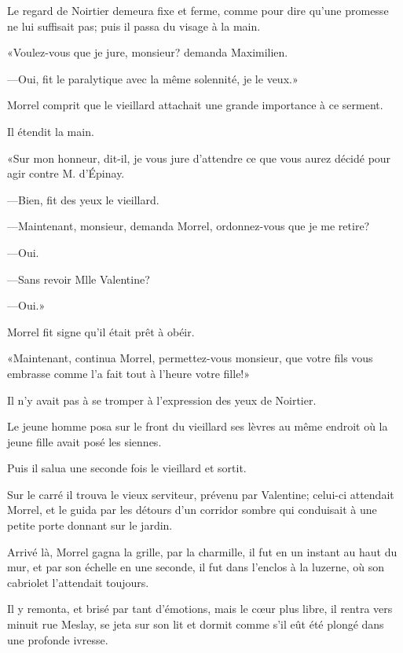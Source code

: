 Le regard de Noirtier demeura fixe et ferme, comme pour dire qu'une promesse ne lui suffisait pas; puis il passa du visage à la main. 

«Voulez-vous que je jure, monsieur? demanda Maximilien. 

—Oui, fit le paralytique avec la même solennité, je le veux.» 

Morrel comprit que le vieillard attachait une grande importance à ce serment. 

Il étendit la main. 

«Sur mon honneur, dit-il, je vous jure d'attendre ce que vous aurez décidé pour agir contre M. d'Épinay. 

—Bien, fit des yeux le vieillard. 

—Maintenant, monsieur, demanda Morrel, ordonnez-vous que je me retire? 

—Oui. 

—Sans revoir Mlle Valentine? 

—Oui.» 

Morrel fit signe qu'il était prêt à obéir. 

«Maintenant, continua Morrel, permettez-vous monsieur, que votre fils vous embrasse comme l'a fait tout à l'heure votre fille!» 

Il n'y avait pas à se tromper à l'expression des yeux de Noirtier. 

Le jeune homme posa sur le front du vieillard ses lèvres au même endroit où la jeune fille avait posé les siennes. 

Puis il salua une seconde fois le vieillard et sortit. 

Sur le carré il trouva le vieux serviteur, prévenu par Valentine; celui-ci attendait Morrel, et le guida par les détours d'un corridor sombre qui conduisait à une petite porte donnant sur le jardin. 

Arrivé là, Morrel gagna la grille, par la charmille, il fut en un instant au haut du mur, et par son échelle en une seconde, il fut dans l'enclos à la luzerne, où son cabriolet l'attendait toujours. 

Il y remonta, et brisé par tant d'émotions, mais le cœur plus libre, il rentra vers minuit rue Meslay, se jeta sur son lit et dormit comme s'il eût été plongé dans une profonde ivresse. 